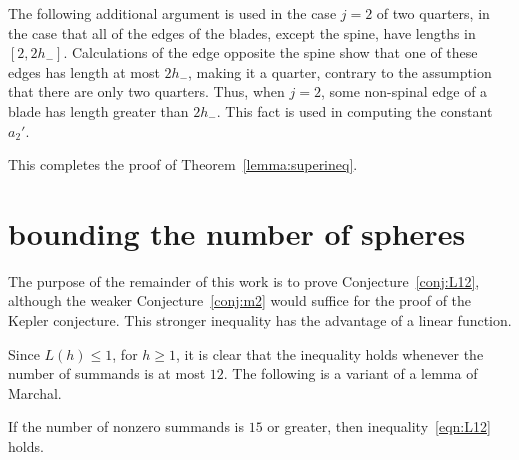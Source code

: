 The following additional argument is used in the case $j=2$ of two quarters, in the case that all of the edges of the blades, except the spine, have lengths in $[2,2h_-]$.  Calculations of the edge opposite the spine show that one of these edges has length at most $2h_-$, making it a quarter, contrary to the assumption that there are only two quarters.  Thus, when $j=2$, some non-spinal edge of a blade has length greater than $2h_-$.  This fact is used in computing the constant $a_2'$.

\smallskip

This completes the proof of Theorem~\ref{lemma:superineq}.


\section{bounding the number of spheres}

The purpose of the remainder of this work is to prove Conjecture~\ref{conj:L12}, although the weaker Conjecture~\ref{conj:m2} would suffice for the proof of the Kepler conjecture.  This stronger inequality has the advantage of a linear function.

Since $L(h)\le 1$, for $h\ge1$, it is clear that the inequality holds whenever the number of summands is at most $12$. The following is a variant of a lemma of Marchal.


\begin{lemma}\label{lemma:13-14}  If the number of nonzero summands is $15$ or greater, then inequality~\ref{eqn:L12} holds.
\end{lemma}

